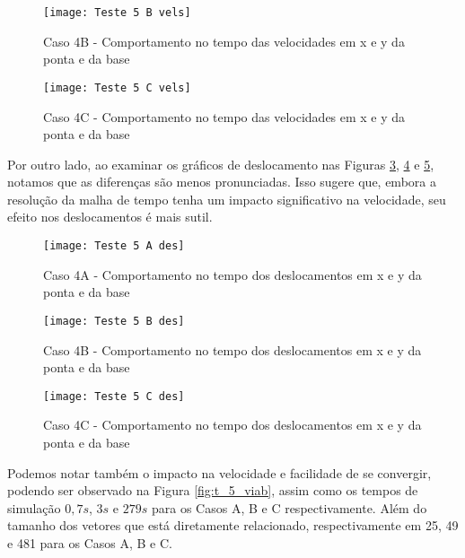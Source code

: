 \begin{figure}[H]
    \begin{center}
    \caption{Caso 4B - Comportamento no tempo das velocidades em x e y da ponta e da base}
    \texttt{[image: Teste 5 B vels]}
    \label{fig:t_5b_vels}
    \end{center}
\end{figure}

\begin{figure}[H]
    \begin{center}
    \caption{Caso 4C - Comportamento no tempo das velocidades em x e y da ponta e da base}
    \texttt{[image: Teste 5 C vels]}
    \label{fig:t_5c_vels}
    \end{center}
\end{figure}

Por outro lado, ao examinar os gráficos de deslocamento nas Figuras \ref{fig:t_5a_des}, \ref{fig:t_5b_des} e \ref{fig:t_5c_des}, notamos que as diferenças são menos pronunciadas. Isso sugere que, embora a resolução da malha de tempo tenha um impacto significativo na velocidade, seu efeito nos deslocamentos é mais sutil.

\begin{figure}[H]
    \begin{center}
    \caption{Caso 4A - Comportamento no tempo dos deslocamentos em x e y da ponta e da base}
    \texttt{[image: Teste 5 A des]}
    \label{fig:t_5a_des}
    \end{center}
\end{figure}

\begin{figure}[H]
    \begin{center}
    \caption{Caso 4B - Comportamento no tempo dos deslocamentos em x e y da ponta e da base}
    \texttt{[image: Teste 5 B des]}
    \label{fig:t_5b_des}
    \end{center}
\end{figure}

\begin{figure}[H]
    \begin{center}
    \caption{Caso 4C - Comportamento no tempo dos deslocamentos em x e y da ponta e da base}
    \texttt{[image: Teste 5 C des]}
    \label{fig:t_5c_des}
    \end{center}
\end{figure}

Podemos notar também o impacto na velocidade e facilidade de se convergir, podendo ser observado na Figura \ref{fig:t_5_viab}, assim
como os tempos de simulação $0,7 s$, $3 s$ e $279 s$ para os Casos A, B e C respectivamente. Além do tamanho dos vetores que está diretamente relacionado,
respectivamente em 25, 49 e 481 para os Casos A, B e C.

